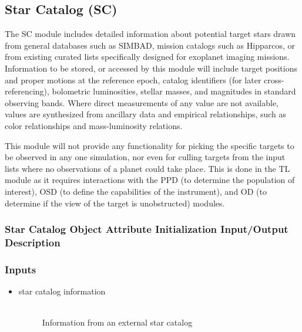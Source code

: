 \documentclass[cleanfoot]{asme2ej}
\begin{document}

\subsection{Star Catalog (SC)}
The SC module includes detailed information about potential target stars drawn from general databases such as SIMBAD, mission catalogs such as Hipparcos, or from existing curated lists specifically designed for exoplanet imaging missions.  Information to be stored, or accessed by this module will include target positions and proper motions at the reference epoch, catalog identifiers (for later cross-referencing), bolometric luminosities, stellar masses, and magnitudes in standard observing bands.  Where direct measurements of any value are not available, values are synthesized from ancillary data and empirical relationships, such as color relationships and mass-luminosity relations.

This module will not provide any functionality for picking the specific targets to be observed in any one simulation, nor even for culling targets from the input lists where no observations of a planet could take place.  This is done in the TL module as it requires interactions with the PPD (to determine the population of interest), OSD (to define the capabilities of the instrument), and OD (to determine if the view of the target is unobstructed) modules.
\label{sec:starcatalog}
\subsubsection{Star Catalog Object Attribute Initialization Input/Output Description} 
\subsubsection*{Inputs}
\begin{itemize}
    \item 
    \begin{description}
        \item[star catalog information] \hfill \\
    Information from an external star catalog 
    \end{description}
\end{itemize}
\end{document}
